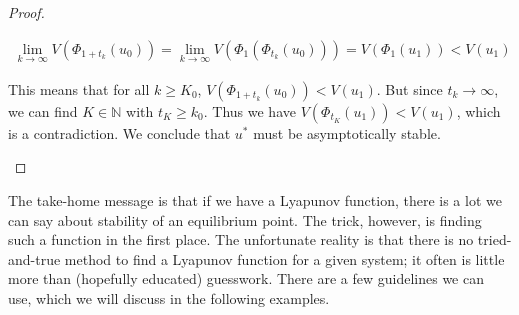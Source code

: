 \documentclass{article}
\def\N{{\mathbb N}}
\begin{document}
\begin{proof}
\begin{enumerate}
	\begin{align*}
	\lim_{k\rightarrow \infty}V(\Phi_{1 + t_k}(u_0)) 
	= \lim_{k\rightarrow \infty}V(\Phi_1(\Phi_{t_k}(u_0)))
	= V(\Phi_1(u_1)) < V(u_1)
	\end{align*}

	This means that for all $k \geq K_0$, $V(\Phi_{1 + t_k}(u_0)) < V(u_1)$. But since $t_k \rightarrow \infty$, we can find $K \in \N$ with $t_K \geq k_0$. Thus we have $V(\Phi_{t_K}(u_1)) < V(u_1)$, which is a contradiction. We conclude that $u^*$ must be asymptotically stable.

\end{enumerate}
\end{proof}

The take-home message is that if we have a Lyapunov function, there is a lot we can say about stability of an equilibrium point. The trick, however, is finding such a function in the first place. The unfortunate reality is that there is no tried-and-true method to find a Lyapunov function for a given system; it often is little more than (hopefully educated) guesswork. There are a few guidelines we can use, which we will discuss in the following examples.
\end{document}
